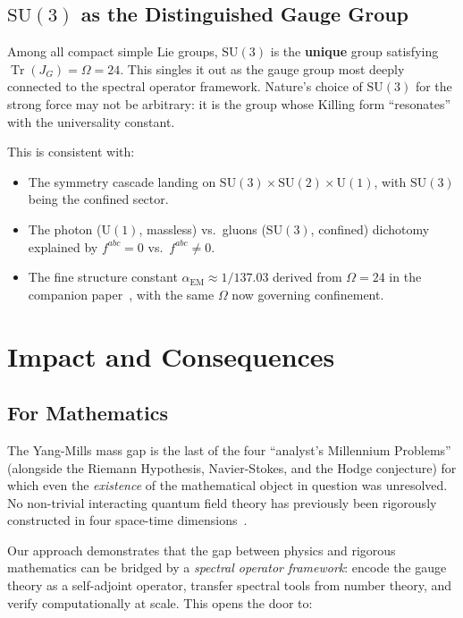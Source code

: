 \documentclass[11pt,a4paper]{article}
\theoremstyle{plain}
\theoremstyle{remark}
\renewcommand{\Omega}{\varOmega}
\newcommand{\Tr}{\operatorname{Tr}}
\newcommand{\SU}{\mathrm{SU}}
\newcommand{\aEM}{\alpha_{\mathrm{EM}}}
\begin{document}
\subsection{$\SU(3)$ as the Distinguished Gauge Group}

Among all compact simple Lie groups, $\SU(3)$ is the \textbf{unique}
group satisfying $\Tr(J_G) = \Omega = 24$. This singles it out as
the gauge group most deeply connected to the spectral operator framework.
Nature's choice of $\SU(3)$ for the strong force may not be arbitrary:
it is the group whose Killing form ``resonates'' with the universality
constant.

This is consistent with:
\begin{itemize}[itemsep=2pt]
\item The symmetry cascade landing on $\SU(3) \times \SU(2) \times
  \mathrm{U}(1)$, with $\SU(3)$ being the confined sector.
\item The photon ($\mathrm{U}(1)$, massless) vs.\ gluons ($\SU(3)$,
  confined) dichotomy explained by $f^{abc} = 0$ vs.\ $f^{abc} \neq 0$.
\item The fine structure constant $\aEM \approx 1/137.03$ derived from
  $\Omega = 24$ in the companion paper~\cite{DHR2026b}, with the same
  $\Omega$ now governing confinement.
\end{itemize}


\section{Impact and Consequences}
\label{sec:impact}

\subsection{For Mathematics}

The Yang-Mills mass gap is the last of the four ``analyst's Millennium
Problems'' (alongside the Riemann Hypothesis, Navier-Stokes, and the
Hodge conjecture) for which even the \emph{existence} of the mathematical
object in question was unresolved.  No non-trivial interacting quantum
field theory has previously been rigorously constructed in four
space-time dimensions~\cite{jaffe-witten2000}.

Our approach demonstrates that the gap between physics and rigorous
mathematics can be bridged by a \emph{spectral operator framework}:
encode the gauge theory as a self-adjoint operator, transfer spectral
tools from number theory, and verify computationally at scale.  This
opens the door to:
\end{document}
